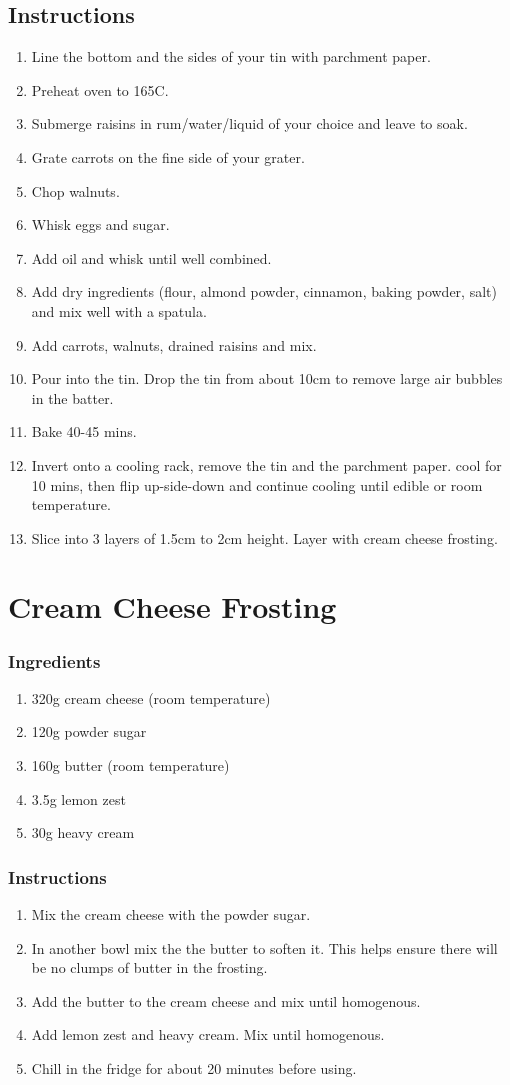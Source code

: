 \documentclass[11pt]{report}
\newcommand{\header}[1]{\subsubsection*{#1}}
\begin{document}
\subsection*{Instructions}
\begin{enumerate}
  \item Line the bottom and the sides of your tin with parchment paper.
  \item Preheat oven to 165C.
  \item Submerge raisins in rum/water/liquid of your choice and leave to soak.
  \item Grate carrots on the fine side of your grater.
  \item Chop walnuts.
  \item Whisk eggs and sugar.
  \item Add oil and whisk until well combined.
  \item Add dry ingredients (flour, almond powder, cinnamon, baking powder,
  salt) and mix well with a spatula.
  \item Add carrots, walnuts, drained raisins and mix.
  \item Pour into the tin. Drop the tin from about 10cm to remove large air
  bubbles in the batter.
  \item Bake 40-45 mins.
  \item Invert onto a cooling rack, remove the tin and the parchment paper.
  cool for 10 mins, then flip up-side-down and continue cooling until edible or
  room temperature.
  \item Slice into 3 layers of 1.5cm to 2cm height. Layer with cream cheese
  frosting.
\end{enumerate}

\section{Cream Cheese Frosting}

\header{Ingredients}
\begin{enumerate}
  \item 320g cream cheese (room temperature)
  \item 120g powder sugar
  \item 160g butter (room temperature)
  \item 3.5g lemon zest
  \item 30g heavy cream
\end{enumerate}

\header{Instructions}
\begin{enumerate}
 \item Mix the cream cheese with the powder sugar.
 \item In another bowl mix the the butter to soften it. This helps ensure there
 will be no clumps of butter in the frosting.
 \item Add the butter to the cream cheese and mix until homogenous.
 \item Add lemon zest and heavy cream. Mix until homogenous.
 \item Chill in the fridge for about 20 minutes before using.
\end{enumerate}
\end{document}

